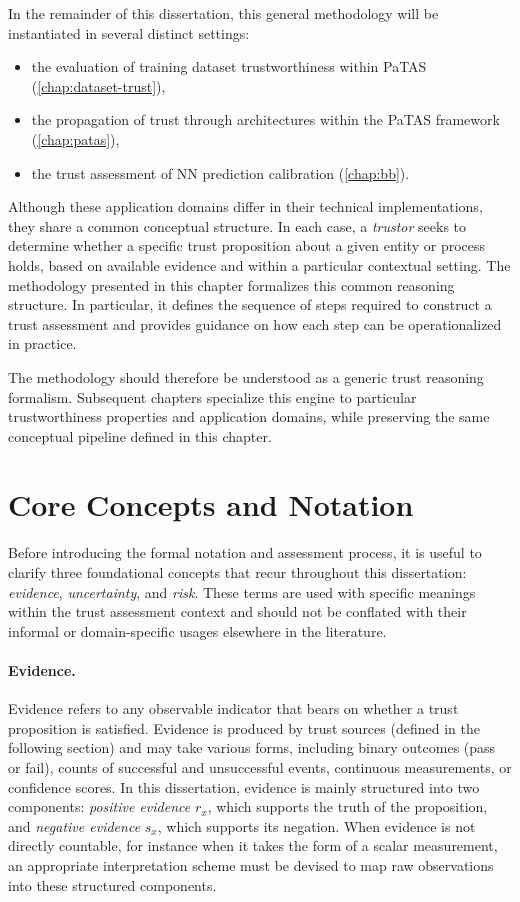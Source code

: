 In the remainder of this dissertation, this general methodology will be instantiated in several distinct settings:
\begin{itemize}
    \item the evaluation of training dataset trustworthiness within \ac{PaTAS} (\cref{chap:dataset-trust}),
    \item the propagation of trust through  architectures within the PaTAS framework (\cref{chap:patas}),
    \item the trust assessment of \ac{NN} prediction calibration (\cref{chap:bb}).
\end{itemize}

Although these application domains differ in their technical implementations, they share a common conceptual structure. In each case, a \emph{trustor} seeks to determine whether a specific trust proposition about a given entity or process holds, based on available evidence and within a particular contextual setting. The methodology presented in this chapter formalizes this common reasoning structure. In particular, it defines the sequence of steps required to construct a trust assessment and provides guidance on how each step can be operationalized in practice.

The methodology should therefore be understood as a generic trust reasoning formalism. Subsequent chapters specialize this engine to particular trustworthiness properties and application domains, while preserving the same conceptual pipeline defined in this chapter.





\section{Core Concepts and Notation}
\label{sec:ch4_core_concepts}
Before introducing the formal notation and assessment process, it is useful to clarify three foundational concepts that recur throughout this dissertation: \emph{evidence}, \emph{uncertainty}, and \emph{risk}. These terms are used with specific meanings within the trust assessment context and should not be conflated with their informal or domain-specific usages elsewhere in the literature.

\paragraph{Evidence.}
Evidence refers to any observable indicator that bears on whether a trust proposition is satisfied. Evidence is produced by trust sources (defined in the following section) and may take various forms, including binary outcomes (pass or fail), counts of successful and unsuccessful events, continuous measurements, or confidence scores. In this dissertation, evidence is mainly structured into two components: \emph{positive evidence} $r_x$, which supports the truth of the proposition, and \emph{negative evidence} $s_x$, which supports its negation. When evidence is not directly countable, for instance when it takes the form of a scalar measurement, an appropriate interpretation scheme must be devised to map raw observations into these structured components.

